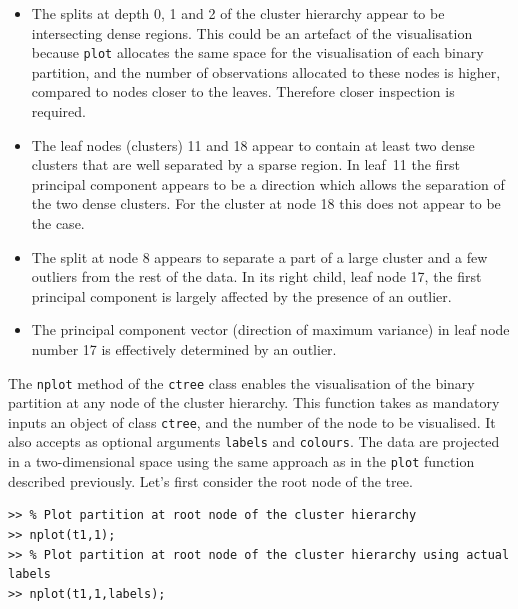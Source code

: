 \documentclass{book}
\begin{document}
\begin{itemize}

\item The splits at depth 0, 1 and 2 of the cluster hierarchy appear to be
intersecting dense regions. This could be an artefact of the visualisation
because {\tt plot} allocates the same space for the visualisation of each
binary partition, and the number of observations allocated to these nodes is
higher, compared to nodes closer to the leaves.  Therefore closer inspection is
required.


\item The leaf nodes (clusters) 11 and 18 appear to contain at
least two dense clusters that are well separated by a sparse region. In leaf~11
the first principal component appears to be a direction which
allows the separation of the two dense clusters. For the cluster at node 18 this
does not appear to be the case.

\item The split at node 8 appears to separate a part of a large cluster and a
few outliers from the rest of the data. In its right child, leaf node 17, the
first principal component is largely affected by the presence of an outlier.

\item The principal component vector (direction of maximum variance) in leaf
node number 17 is effectively determined by an outlier.

\end{itemize}


\noindent
%
The {\tt nplot} method of the {\tt ctree} class enables the visualisation of
the binary partition at any node of the cluster hierarchy. This function takes
as mandatory inputs an object of class {\tt ctree}, and the number of the node
to be visualised. It also accepts as optional arguments {\tt labels} and {\tt colours}.
The data are projected in a two-dimensional space using the same approach
as in the {\tt plot} function described previously.
%
Let's first consider the root node of the tree.

\begin{verbatim}
>> % Plot partition at root node of the cluster hierarchy
>> nplot(t1,1); 
>> % Plot partition at root node of the cluster hierarchy using actual labels
>> nplot(t1,1,labels); 
\end{verbatim}
\end{document}
